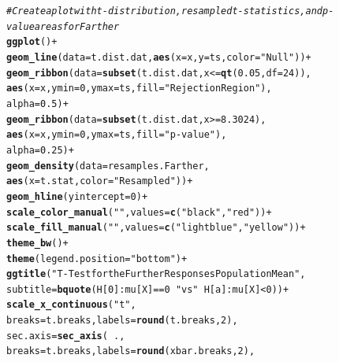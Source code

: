 \documentclass{article}\usepackage[]{graphicx}\usepackage[]{xcolor}
\makeatletter
\newcommand{\hlnum}[1]{\textcolor[rgb]{0.686,0.059,0.569}{#1}}%
\newcommand{\hlsng}[1]{\textcolor[rgb]{0.192,0.494,0.8}{#1}}%
\newcommand{\hlcom}[1]{\textcolor[rgb]{0.678,0.584,0.686}{\textit{#1}}}%
\newcommand{\hlopt}[1]{\textcolor[rgb]{0,0,0}{#1}}%
\newcommand{\hldef}[1]{\textcolor[rgb]{0.345,0.345,0.345}{#1}}%
\newcommand{\hlkwc}[1]{\textcolor[rgb]{0.333,0.667,0.333}{#1}}%
\newcommand{\hlkwd}[1]{\textcolor[rgb]{0.737,0.353,0.396}{\textbf{#1}}}%
\newenvironment{kframe}{%
 \def\at@end@of@kframe{}%
 \ifinner\ifhmode%
  \def\at@end@of@kframe{\end{minipage}}%
  \begin{minipage}{\columnwidth}%
 \fi\fi%
 \def\FrameCommand##1{\hskip\@totalleftmargin \hskip-\fboxsep
 \colorbox{shadecolor}{##1}\hskip-\fboxsep
     \hskip-\linewidth \hskip-\@totalleftmargin \hskip\columnwidth}%
 \MakeFramed {\advance\hsize-\width
   \@totalleftmargin\z@ \linewidth\hsize
   \@setminipage}}%
 {\par\unskip\endMakeFramed%
 \at@end@of@kframe}
\newenvironment{knitrout}{}{} %
\makeatother
\begin{document}
\begin{enumerate}
\begin{enumerate}
\begin{knitrout}
\begin{kframe}
\begin{alltt}
\hlcom{# Create a plot with t-distribution, resampled t-statistics, and p-value areas for Farther}
\hlkwd{ggplot}\hldef{()} \hlopt{+}
  \hlkwd{geom_line}\hldef{(}\hlkwc{data} \hldef{= t.dist.dat,} \hlkwd{aes}\hldef{(}\hlkwc{x} \hldef{= x,} \hlkwc{y} \hldef{= ts,} \hlkwc{color} \hldef{=} \hlsng{"Null"}\hldef{))} \hlopt{+}
  \hlkwd{geom_ribbon}\hldef{(}\hlkwc{data} \hldef{=} \hlkwd{subset}\hldef{(t.dist.dat, x} \hlopt{<=} \hlkwd{qt}\hldef{(}\hlnum{0.05}\hldef{,} \hlkwc{df} \hldef{=} \hlnum{24}\hldef{)),}
              \hlkwd{aes}\hldef{(}\hlkwc{x} \hldef{= x,} \hlkwc{ymin} \hldef{=} \hlnum{0}\hldef{,} \hlkwc{ymax} \hldef{= ts,} \hlkwc{fill} \hldef{=} \hlsng{"Rejection Region"}\hldef{),}
              \hlkwc{alpha} \hldef{=} \hlnum{0.5}\hldef{)} \hlopt{+}
  \hlkwd{geom_ribbon}\hldef{(}\hlkwc{data} \hldef{=} \hlkwd{subset}\hldef{(t.dist.dat, x} \hlopt{>=} \hlnum{8.3024}\hldef{),}
              \hlkwd{aes}\hldef{(}\hlkwc{x} \hldef{= x,} \hlkwc{ymin} \hldef{=} \hlnum{0}\hldef{,} \hlkwc{ymax} \hldef{= ts,} \hlkwc{fill} \hldef{=} \hlsng{"p-value"}\hldef{),}
              \hlkwc{alpha} \hldef{=} \hlnum{0.25}\hldef{)} \hlopt{+}
  \hlkwd{geom_density}\hldef{(}\hlkwc{data} \hldef{= resamples.Farther,}
               \hlkwd{aes}\hldef{(}\hlkwc{x} \hldef{= t.stat,} \hlkwc{color} \hldef{=} \hlsng{"Resampled"}\hldef{))} \hlopt{+}
  \hlkwd{geom_hline}\hldef{(}\hlkwc{yintercept} \hldef{=} \hlnum{0}\hldef{)} \hlopt{+}
  \hlkwd{scale_color_manual}\hldef{(}\hlsng{""}\hldef{,} \hlkwc{values} \hldef{=} \hlkwd{c}\hldef{(}\hlsng{"black"}\hldef{,} \hlsng{"red"}\hldef{))} \hlopt{+}
  \hlkwd{scale_fill_manual}\hldef{(}\hlsng{""}\hldef{,} \hlkwc{values} \hldef{=} \hlkwd{c}\hldef{(}\hlsng{"lightblue"}\hldef{,} \hlsng{"yellow"}\hldef{))} \hlopt{+}
  \hlkwd{theme_bw}\hldef{()} \hlopt{+}
  \hlkwd{theme}\hldef{(}\hlkwc{legend.position} \hldef{=} \hlsng{"bottom"}\hldef{)} \hlopt{+}
  \hlkwd{ggtitle}\hldef{(}\hlsng{"T-Test for the Further Responses Population Mean"}\hldef{,}
          \hlkwc{subtitle} \hldef{=} \hlkwd{bquote}\hldef{(H[}\hlnum{0}\hldef{]}\hlopt{:}\hldef{mu[X]} \hlopt{==} \hlnum{0} \hlopt{~} \hlsng{"vs"} \hlopt{~} \hldef{H[a]}\hlopt{:}\hldef{mu[X]} \hlopt{<} \hlnum{0}\hldef{))} \hlopt{+}
  \hlkwd{scale_x_continuous}\hldef{(}\hlsng{"t"}\hldef{,}
                     \hlkwc{breaks} \hldef{= t.breaks,} \hlkwc{labels} \hldef{=} \hlkwd{round}\hldef{(t.breaks,} \hlnum{2}\hldef{),}
                     \hlkwc{sec.axis} \hldef{=} \hlkwd{sec_axis}\hldef{(}\hlopt{~} \hldef{.,}
                                         \hlkwc{breaks} \hldef{= t.breaks,} \hlkwc{labels} \hldef{=} \hlkwd{round}\hldef{(xbar.breaks,} \hlnum{2}\hldef{),}

\end{alltt}
\end{kframe}
\end{knitrout}
\end{enumerate}
\end{enumerate}
\end{document}
